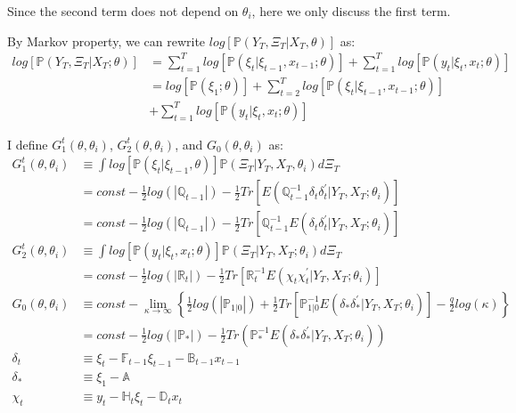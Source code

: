 \documentclass[10pt, titlepage]{article}
\numberwithin{equation}{section}
\begin{document}
Since the second term does not depend on $\theta_i$, here we only discuss the first term. 

By Markov property, we can rewrite $log[\mathbb{P}(Y_T,\Xi_T|X_T,\theta)]$ as:
\begin{align}
    log[\mathbb{P}(Y_T,\Xi_T|X_T;\theta)] &= \sum_{t=1}^{T}log[\mathbb{P}(\xi_t|\xi_{t-1},x_{t-1};\theta)] 
    + \sum_{t=1}^{T}log[\mathbb{P}(y_t|\xi_t,x_t;\theta)] \nonumber \\
    &= log[\mathbb{P}(\xi_1;\theta)] + \sum_{t=2}^{T}log[\mathbb{P}(\xi_t|\xi_{t-1},x_{t-1};\theta)] \nonumber \\ 
    &+ \sum_{t=1}^{T}log[\mathbb{P}(y_t|\xi_t,x_t;\theta)]\label{eq:log}
\end{align}

I define $G_1^{t}(\theta,\theta_i)$, $G_2^{t}(\theta,\theta_i)$, and $G_0(\theta,\theta_i)$ as:
\begin{align}
    G_1^{t}(\theta,\theta_{i}) &\equiv \int log[\mathbb{P}(\xi_t|\xi_{t-1},\theta)]\mathbb{P}(\Xi_T|Y_T,X_T,\theta_{i})d\Xi_T \nonumber \\
    &= const -\frac{1}{2}log(|\mathbb{Q}_{t-1}|)-\frac{1}{2}Tr[E(\mathbb{Q}_{t-1}^{-1}\delta_t\delta_t^{'}|Y_T,X_T;\theta_{i})] \nonumber \\
    &= const - \frac{1}{2}log(|\mathbb{Q}_{t-1}|) - \frac{1}{2}Tr[\mathbb{Q}_{t-1}^{-1}E(\delta_t\delta_t^{'}|Y_T,X_T;\theta_{i})] \label{eq:log1_trace} \\
    G_2^t(\theta,\theta_{i}) &\equiv \int log[\mathbb{P}(y_t|\xi_{t},x_t; \theta)]\mathbb{P}(\Xi_T|Y_T,X_T;\theta_{i})d\Xi_T \nonumber \\
    &= const - \frac{1}{2}log(|\mathbb{R}_t|)-\frac{1}{2}Tr[\mathbb{R}_t^{-1}E(\chi_t\chi_t^{'}|Y_T,X_T;\theta_{i})] \label{eq:log2_trace} \\
    G_0(\theta,\theta_{i}) &\equiv const - \lim_{\kappa\rightarrow\infty}\left\{\frac{1}{2}log(|\mathbb{P}_{1|0}|) + \frac{1}{2}Tr[\mathbb{P}_{1|0}^{-1}E(\delta_*\delta_*^{'}|Y_T, X_T; \theta_{i})] - \frac{q}{2}log(\kappa)\right\} \nonumber \\
    &=const - \frac{1}{2}log(|\mathbb{P}_*|)-\frac{1}{2}Tr(\mathbb{P}_*^{-1}E(\delta_*\delta_*^{'}|Y_T, X_T; \theta_{i})) \\
    \delta_t &\equiv \xi_t - \mathbb{F}_{t-1}\xi_{t-1} - \mathbb{B}_{t-1}x_{t-1} \nonumber \\
    \delta_* &\equiv \xi_1 - \mathbb{A} \nonumber \\
    \chi_t &\equiv y_t - \mathbb{H}_t\xi_t - \mathbb{D}_tx_t \nonumber
\end{align}
\end{document}
